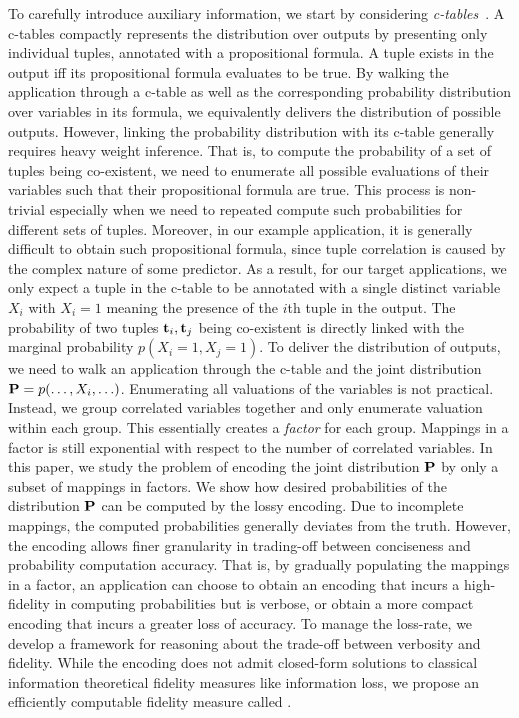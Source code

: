 To carefully introduce auxiliary information, we start by considering \emph{c-tables}~\cite{suciu2009probabilistic}.
A c-tables compactly represents the distribution over outputs by presenting only individual tuples, annotated with a propositional formula.
A tuple exists in the output iff its propositional formula evaluates to be true.
By walking the application through a c-table as well as the corresponding probability distribution over variables in its formula, we equivalently delivers the distribution of possible outputs.
However, linking the probability distribution with its c-table generally requires heavy weight inference.
That is, to compute the probability of a set of tuples being co-existent, we need to enumerate all possible evaluations of their variables such that their propositional formula are true.
This process is non-trivial especially when we need to repeated compute such probabilities for different sets of tuples.
Moreover, in our example application, it is generally difficult to obtain such propositional formula, since tuple correlation is caused by the complex nature of some predictor.
As a result, for our target applications, we only expect a tuple in the c-table to be annotated with a single distinct variable $X_i$ with $X_i=1$ meaning the presence of the $i$th tuple in the output.
The probability of two tuples $\mathbf{t}_i,\mathbf{t}_j$ being co-existent is directly linked with the marginal probability $p(X_i=1,X_j=1)$.
To deliver the distribution of outputs, we need to walk an application through the c-table and the joint distribution $\mathbf{P}=p(\ldots,X_i,\ldots)$.
Enumerating all valuations of the variables is not practical.
Instead, we group correlated variables together and only enumerate valuation within each group.
This essentially creates a \emph{factor} for each group. 
Mappings in a factor is still exponential with respect to the number of correlated variables.
In this paper, we study the problem of encoding the joint distribution $\mathbf{P}$ by only a subset of mappings in factors.
We show how desired probabilities of the distribution $\mathbf{P}$ can be computed by the lossy encoding. 
Due to incomplete mappings, the computed probabilities generally deviates from the truth.
However, the encoding allows finer granularity in trading-off between conciseness and probability computation accuracy.
That is, by gradually populating the mappings in a factor, an application can choose to obtain an encoding that incurs a high-fidelity in computing probabilities but is verbose, or obtain a more compact encoding that incurs a greater loss of accuracy. 
To manage the loss-rate, we develop a framework for reasoning about the trade-off between verbosity and fidelity.   
While the encoding does not admit closed-form solutions to classical information theoretical fidelity measures like information loss, we propose an efficiently computable fidelity measure called \Errorname.  




